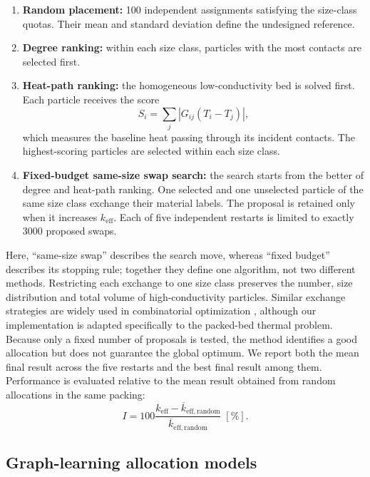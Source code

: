 \documentclass[12pt,a4paper]{article}
\begin{document}
	\begin{enumerate}
		\item \textbf{Random placement:} 100 independent assignments satisfying the
		size-class quotas. Their mean and standard deviation define the undesigned
		reference.
		\item \textbf{Degree ranking:} within each size class, particles with the most
		contacts are selected first.
		\item \textbf{Heat-path ranking:} the homogeneous low-conductivity bed is
		solved first. Each particle receives the score
		\begin{equation}
			S_i=\sum_j\left|G_{ij}(T_i-T_j)\right|,
		\end{equation}
		which measures the baseline heat passing through its incident contacts. The
		highest-scoring particles are selected within each size class.
		\item \textbf{Fixed-budget same-size swap search:} the search starts from the
		better of degree and heat-path ranking. One selected and one unselected
		particle of the same size class exchange their material labels. The proposal
		is retained only when it increases $k_{\mathrm{eff}}$. Each of five independent
		restarts is limited to exactly 3000 proposed swaps.
	\end{enumerate}
	Here, ``same-size swap'' describes the search move, whereas ``fixed budget''
	describes its stopping rule; together they define one algorithm, not two
	different methods. Restricting each exchange to one size class preserves the
	number, size distribution and total volume of high-conductivity particles.
	Similar exchange strategies are widely used in
	combinatorial optimization
	\cite{KernighanLin1970,Maringer2003}, although our implementation is adapted
	specifically to the packed-bed thermal problem. Because only a fixed number of
	proposals is tested, the method identifies a good allocation but does not
	guarantee the global optimum. We report both the mean final result across the
	five restarts and the best final result among them. Performance is evaluated relative to the mean
	result obtained from random allocations in the same packing:
	\begin{equation}
		I=100\frac{k_{\mathrm{eff}}-\overline{k}_{\mathrm{eff,random}}}
		{\overline{k}_{\mathrm{eff,random}}}\;[\%].
		\label{eq:improvement}
	\end{equation}
	
	\subsection{Graph-learning allocation models}
\end{document}
